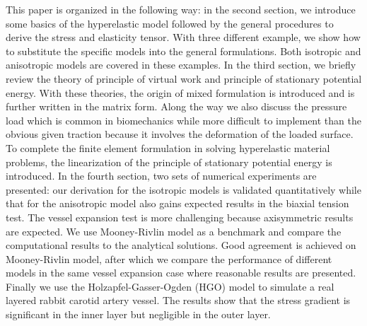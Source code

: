 This paper is organized in the following way: in the second section, we introduce some basics of the hyperelastic model followed by the general procedures to derive the stress and elasticity tensor. With three different example, we show how to substitute the specific models into the general formulations. Both isotropic and anisotropic models are covered in these examples. In the third section, we briefly review the theory of principle of virtual work and principle of stationary potential energy. With these theories, the origin of mixed formulation is introduced and is further written in the matrix form. Along the way we also discuss the pressure load which is common in biomechanics while more difficult to implement than the obvious given traction because it involves the deformation of the loaded surface. To complete the finite element formulation in solving hyperelastic material problems, the linearization of the principle of stationary potential energy is introduced. In the fourth section, two sets of numerical experiments are presented: our derivation for the isotropic models is validated quantitatively while that for the anisotropic model also gains expected results in the biaxial tension test. The vessel expansion test is more challenging because axisymmetric results are expected. We use Mooney-Rivlin model as a benchmark and compare the computational results to the analytical solutions. Good agreement is achieved on Mooney-Rivlin model, after which we compare the performance of different models in the same vessel expansion case where reasonable results are presented. Finally we use the Holzapfel-Gasser-Ogden (HGO) model to simulate a real layered rabbit carotid artery vessel. The results show that the stress gradient is significant in the inner layer but negligible in the outer layer.

 




